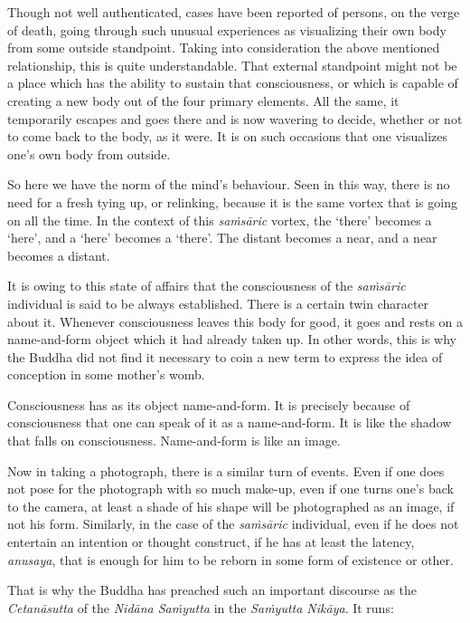 Though not well authenticated, cases have been reported of persons, on the verge of death, going through such unusual experiences as visualizing their own body from some outside standpoint. Taking into consideration the above mentioned relationship, this is quite understandable. That external standpoint might not be a place which has the ability to sustain that consciousness, or which is capable of creating a new body out of the four primary elements. All the same, it temporarily escapes and goes there and is now wavering to decide, whether or not to come back to the body, as it were. It is on such occasions that one visualizes one's own body from outside.

So here we have the norm of the mind's behaviour. Seen in this way, there is no need for a fresh tying up, or relinking, because it is the same vortex that is going on all the time. In the context of this \emph{saṁsāric} vortex, the `there' becomes a `here', and a `here' becomes a `there'. The distant becomes a near, and a near becomes a distant.

It is owing to this state of affairs that the consciousness of the \emph{saṁsāric} individual is said to be always established. There is a certain twin character about it. Whenever consciousness leaves this body for good, it goes and rests on a name-and-form object which it had already taken up. In other words, this is why the Buddha did not find it necessary to coin a new term to express the idea of conception in some mother's womb.

Consciousness has as its object name-and-form. It is precisely because of consciousness that one can speak of it as a name-and-form. It is like the shadow that falls on consciousness. Name-and-form is like an image.

Now in taking a photograph, there is a similar turn of events. Even if one does not pose for the photograph with so much make-up, even if one turns one's back to the camera, at least a shade of his shape will be photographed as an image, if not his form. Similarly, in the case of the \emph{saṁsāric} individual, even if he does not entertain an intention or thought construct, if he has at least the latency, \emph{anusaya}, that is enough for him to be reborn in some form of existence or other.

That is why the Buddha has preached such an important discourse as the \emph{Cetanāsutta} of the \emph{Nidāna Saṁyutta} in the \emph{Saṁyutta Nikāya}. It runs:

